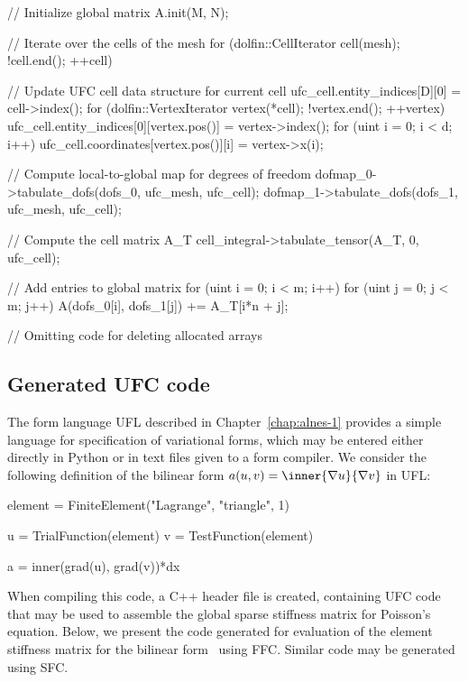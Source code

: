 \begin{c++}
{  // Initialize global matrix
  A.init(M, N);

  // Iterate over the cells of the mesh
  for (dolfin::CellIterator cell(mesh); !cell.end(); ++cell)
  {
    // Update UFC cell data structure for current cell
    ufc_cell.entity_indices[D][0] = cell->index();
    for (dolfin::VertexIterator vertex(*cell); !vertex.end(); ++vertex)
    {
      ufc_cell.entity_indices[0][vertex.pos()] = vertex->index();
      for (uint i = 0; i < d; i++)
        ufc_cell.coordinates[vertex.pos()][i] = vertex->x(i);
    }

    // Compute local-to-global map for degrees of freedom
    dofmap_0->tabulate_dofs(dofs_0, ufc_mesh, ufc_cell);
    dofmap_1->tabulate_dofs(dofs_1, ufc_mesh, ufc_cell);

    // Compute the cell matrix A_T
    cell_integral->tabulate_tensor(A_T, 0, ufc_cell);

    // Add entries to global matrix
    for (uint i = 0; i < m; i++)
      for (uint j = 0; j < m; j++)
        A(dofs_0[i], dofs_1[j]) += A_T[i*n + j];
  }

  // Omitting code for deleting allocated arrays
}
\end{c++}

\subsection{Generated UFC code}

The form language UFL described in Chapter~\ref{chap:alnes-1} provides
a simple language for specification of variational forms, which may be
entered either directly in Python or in text files given to a form
compiler.  We consider the following definition of the bilinear form
$a(u, v) = \inner{\nabla u}{\nabla v}$ in UFL:
\begin{c++}
element = FiniteElement("Lagrange", "triangle", 1)

u = TrialFunction(element)
v = TestFunction(element)

a = inner(grad(u), grad(v))*dx
\end{c++}

When compiling this code, a C++ header file is created, containing UFC
code that may be used to assemble the global sparse stiffness matrix
for Poisson's equation. Below, we present the code generated for
evaluation of the element stiffness matrix for the bilinear
form~ using FFC. Similar code may be generated using SFC.

